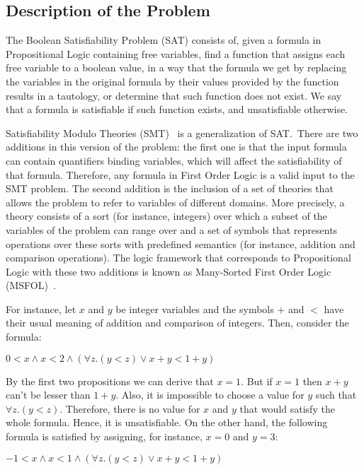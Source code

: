 
\subsection{Description of the Problem}

The Boolean Satisfiability Problem (SAT) consists of, given a formula in Propositional Logic containing free variables, find a function that assigns each free variable to a boolean value, in a way that the formula we get by replacing the variables in the original formula by their values provided by the function results in a tautology, or determine that such function does not exist. We say that a formula is satisfiable if such function exists, and unsatisfiable otherwise.

Satisfiability Modulo Theories (SMT)~\cite{smt} is a generalization of SAT.\ There are two additions in this version of the problem: the first one is that the input formula can contain quantifiers binding variables, which will affect the satisfiability of that formula. Therefore, any formula in First Order Logic is a valid input to the SMT problem. The second addition is the inclusion of a set of theories that allows the problem to refer to variables of different domains. More precisely, a theory consists of a sort (for instance, integers) over which a subset of the variables of the problem can range over and a set of symbols that represents operations over these sorts with predefined semantics (for instance, addition and comparison operations). The logic framework that corresponds to Propositional Logic with these two additions is known as Many-Sorted First Order Logic (MSFOL)~\cite{many_sorted}.

For instance, let $x$ and $y$ be integer variables and the symbols $+$ and $<$ have their usual meaning of addition and comparison of integers. Then, consider the formula:

\begin{center}
  $0 < x \land x < 2 \land (\forall z . (y < z) \lor x + y < 1 + y)$
\end{center}

By the first two propositions we can derive that $x = 1$. But if $x = 1$ then $x + y$ can't be lesser than $1 + y$. Also, it is impossible to choose a value for $y$ such that $\forall z . (y < z)$. Therefore, there is no value for $x$ and $y$ that would satisfy the whole formula. Hence, it is unsatisfiable. On the other hand, the following formula is satisfied by assigning, for instance, $x = 0$ and $y = 3$:

\begin{center}
  $-1 < x \land x < 1 \land (\forall z . (y < z) \lor x + y < 1 + y)$
\end{center}

